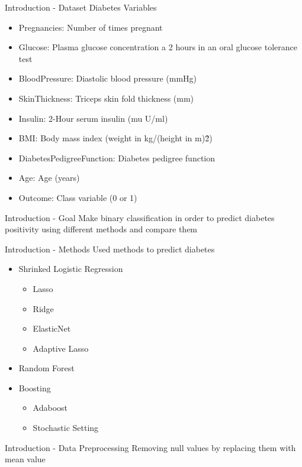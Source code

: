 \begin{frame}{Introduction - Dataset Diabetes}
Variables\vspace{-1ex}
\begin{itemize}
    \item Pregnancies: Number of times pregnant
    \item Glucose: Plasma glucose concentration a 2 hours in an oral glucose tolerance test
    \item BloodPressure: Diastolic blood pressure (mmHg)
    \item SkinThickness: Triceps skin fold thickness (mm)
    \item Insulin: 2-Hour serum insulin (mu U/ml)
    \item BMI: Body mass index (weight in kg/(height in m)\^2)
    \item DiabetesPedigreeFunction: Diabetes pedigree function
    \item Age: Age (years)
    \item Outcome: Class variable (0 or 1)
\end{itemize}
\end{frame}

\begin{frame}{Introduction - Goal}
    Make binary classification in order to predict diabetes positivity using different methods and compare them     
\end{frame}

\begin{frame}{Introduction - Methods}
    Used methods to predict diabetes
    \begin{itemize}
        \item Shrinked Logistic Regression
        \begin{itemize}
            \item Lasso
            \item Ridge
            \item ElasticNet
            \item Adaptive Lasso
        \end{itemize}
        \item Random Forest
        \item Boosting
        \begin{itemize}
            \item Adaboost
            \item Stochastic Setting 
        \end{itemize}
    \end{itemize}
\end{frame}

\begin{frame}{Introduction - Data Preprocessing}
    Removing null values by replacing them with mean value
\end{frame}